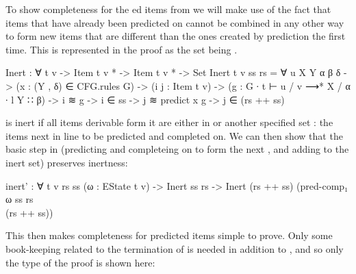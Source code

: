 		To show completeness for the ed items from
		 we will make use of the fact that items that have
		already been predicted on cannot be combined in any other way to form
		new items that are different than the ones created by prediction the
		first time. This is represented in the proof as the set 
		being .

		\begin{code}
			  Inert : ∀ {t v} -> Item t v * -> Item t v * -> Set
			  Inert {t} {v} ss rs =
			    ∀ {u X Y α β δ} ->
			    (x : (Y , δ) ∈ CFG.rules G) ->
			    (i j : Item t v) ->
			    (g : G ∙ t ⊢ u / v ⟶* X / α ∙ l Y ∷ β) ->
			    i ≋ g -> i ∈ ss ->
			    j ≋ predict x g ->
			      j ∈ (rs ++ ss)
		\end{code}

		 is inert if all items derivable form it are either in
		 or another specified set : the items next in
		line to be predicted and completed on. We can then show that the basic
		step in  (predicting and completeing on 
		to form the next , and adding  to the inert set)
		preserves inertness:

		\begin{code}
			  inert' : ∀ {t v rs ss} (ω : EState t v) ->
			    Inert ss rs ->
			    Inert (rs ++ ss) (pred-comp₁ ω ss rs \\ (rs ++ ss))
    	\end{code}

		This then makes completeness for  predicted items
		simple to prove. Only some book-keeping related to the termination of
		 is needed in addition to , and so
		only the type of the proof is shown here:

